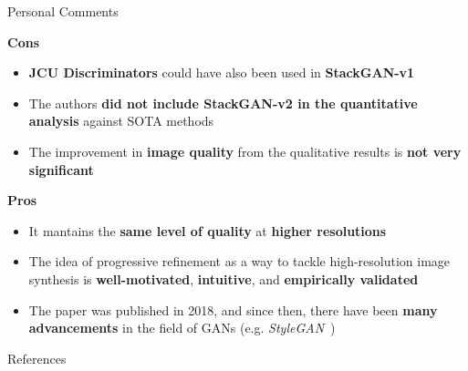 \documentclass{beamer}
\begin{document}
\begin{frame}{Personal Comments}
    
    \begin{block}{\textbf{Cons}}
        \begin{itemize}
            \item \textbf{JCU Discriminators} could have also been used in \textbf{StackGAN-v1}
            \item The authors \textbf{did not include StackGAN-v2 in the quantitative analysis} against SOTA methods
            \item The improvement in \textbf{image quality} from the qualitative results is \textbf{not very significant}
        \end{itemize}
    \end{block}
    
    \begin{block}{\textbf{Pros}}
        \begin{itemize}
            \item It mantains the \textbf{same level of quality} at \textbf{higher resolutions}
            \item The idea of progressive refinement as a way to tackle high-resolution image synthesis is \textbf{well-motivated}, \textbf{intuitive}, and \textbf{empirically validated}
        \end{itemize}
    \end{block}
    \begin{itemize}
        \item The paper was published in 2018, and since then, there have been \textbf{many advancements} in the field of GANs (e.g. \textit{StyleGAN}~\cite{stylegan})
    \end{itemize}
\end{frame}

\begin{frame}[allowframebreaks]{References}
    \nocite{*} %
     
    
\end{frame}
\end{document}
